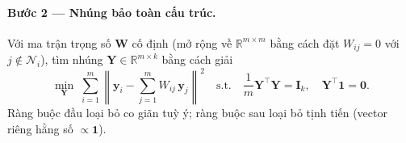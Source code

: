 \paragraph{Bước 2 — Nhúng bảo toàn cấu trúc.}
Với ma trận trọng số $\mathbf{W}$ cố định (mở rộng về $\mathbb{R}^{m\times m}$
bằng cách đặt $W_{ij}=0$ với $j\notin\mathcal{N}_i$), tìm nhúng
$\mathbf{Y}\in\mathbb{R}^{m\times k}$ bằng cách giải
\begin{equation}\label{eq:lle_embed}
  \min_{\mathbf{Y}}\;
  \sum_{i=1}^m
  \left\|\mathbf{y}_i - \sum_{j=1}^m W_{ij}\,\mathbf{y}_j\right\|^2
  \quad\text{s.t.}\quad
  \frac{1}{m}\mathbf{Y}^\top\mathbf{Y} = \mathbf{I}_k,\quad
  \mathbf{Y}^\top\mathbf{1} = \mathbf{0}.
\end{equation}
Ràng buộc đầu loại bỏ co giãn tuỳ ý; ràng buộc sau loại bỏ tịnh tiến
(vector riêng hằng số $\propto\mathbf{1}$).
 
